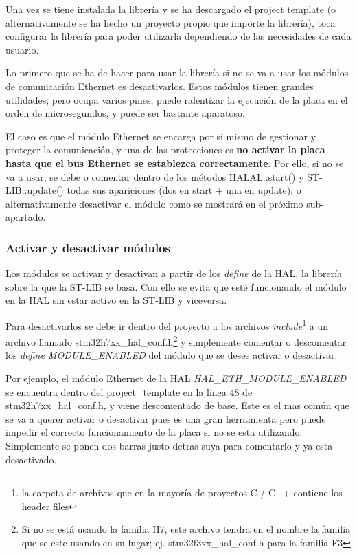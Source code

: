 \documentclass{report}
\begin{document}
Una vez se tiene instalada la librería y se ha descargado el project template (o alternativamente se ha hecho un proyecto propio que importe la librería), toca configurar la librería para poder utilizarla dependiendo de las necesidades de cada usuario. \par \vspace{0.3cm}

Lo primero que se ha de hacer para usar la librería si no se va a usar los módulos de comunicación Ethernet es desactivarlos. Estos módulos tienen grandes utilidades; pero ocupa varios pines, puede ralentizar la ejecución de la placa en el orden de microsegundos, y puede ser bastante aparatoso. \par
El caso es que el módulo Ethernet se encarga por si mismo de gestionar y proteger la comunicación, y una de las protecciones es \textbf{no activar la placa hasta que el bus Ethernet se establezca correctamente}. Por ello, si no se va a usar, se debe o comentar dentro de los métodos HALAL::start() y ST-LIB::update() todas sus apariciones (dos en start + una en update); o alternativamente desactivar el módulo como se mostrará en el próximo sub-apartado. 

\subsubsection{Activar y desactivar módulos}
Los módulos se activan y desactivan a partir de los \textit{define} de la HAL, la librería sobre la que la ST-LIB se basa. Con ello se evita que esté funcionando el módulo en la HAL sin estar activo en la ST-LIB y viceversa. 
\par \vspace{0.3cm}

Para desactivarlos se debe ir dentro del proyecto a los archivos \textit{include}\footnote{la carpeta de archivos que en la mayoría de proyectos C / C++ contiene los header files} a un archivo llamado stm32h7xx\_hal\_conf.h\footnote{Si no se está usando la familia H7, este archivo tendra en el nombre la familia que se este usando en su lugar; ej. stm32f3xx\_hal\_conf.h para la familia F3} y simplemente comentar o descomentar los \textit{define MODULE\_ENABLED} del módulo que se desee activar o desactivar. 
\par \vspace{0.3cm}

Por ejemplo, el módulo Ethernet de la HAL \textit{HAL\_ETH\_MODULE\_ENABLED} se encuentra dentro del project\_template en la linea 48 de stm32h7xx\_hal\_conf.h, y viene descomentado de base. Este es el mas común que se va a querer activar o desactivar pues es una gran herramienta pero puede impedir el correcto funcionamiento de la placa si no se esta utilizando. Simplemente se ponen dos barras justo detras suya para comentarlo y ya esta desactivado.
\end{document}
